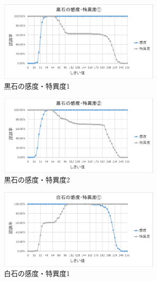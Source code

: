 \documentclass[openright]{nitocs}
\numberwithin{equation}{section}
\begin{document}
            \begin{figure}[tb] %
                \begin{center}
                \includegraphics[width=80mm,height=40mm]{Case1_Black_TPF_TNF.eps} 
                \caption{黒石の感度・特異度1}
                \label{Case1Black}
                \end{center}
            \end{figure}

            \begin{figure}[tb] %
                \begin{center}
                \includegraphics[width=80mm,height=40mm]{Case2_Black_TPF_TNF.eps} 
                \caption{黒石の感度・特異度2}
                \label{Case2Black}
                \end{center}
            \end{figure}

            \begin{figure}[tb] %
                \begin{center}
                \includegraphics[width=80mm,height=40mm]{Case1_White_TPF_TNF.eps} 
                \caption{白石の感度・特異度1}
                \label{Case1White}
                \end{center}
            \end{figure}
            
\end{document}
